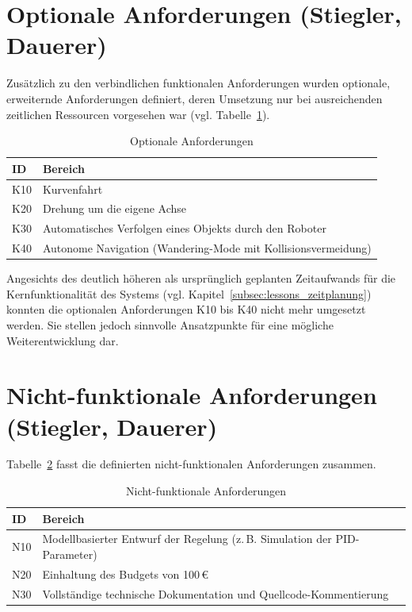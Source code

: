 \documentclass[fontsize=12pt,
parskip=half,	%
department=FakM,  %
logostyle=flat,
twoside, %
DIV=15,BCOR=10mm, %
]{OTHRreprt}
\begin{document}
\section{Optionale Anforderungen (Stiegler, Dauerer)}
\label{sec:optionale_anforderungen}

Zusätzlich zu den verbindlichen funktionalen Anforderungen wurden optionale, erweiternde Anforderungen definiert, deren Umsetzung nur bei ausreichenden zeitlichen Ressourcen vorgesehen war (vgl. Tabelle~\ref{tab:optionale_anforderungen}).

\begin{table}[h]
    \centering
    \caption{Optionale Anforderungen}
    \label{tab:optionale_anforderungen}
    \begin{tabular}{|l|l|}
        \hline
        \textbf{ID} & \textbf{Bereich} \\
        \hline
        K10 & Kurvenfahrt \\
        \hline
        K20 & Drehung um die eigene Achse \\
        \hline
        K30 & Automatisches Verfolgen eines Objekts durch den Roboter \\
        \hline
        K40 & Autonome Navigation (Wandering-Mode mit Kollisionsvermeidung) \\
        \hline
    \end{tabular}
\end{table}

Angesichts des deutlich höheren als ursprünglich geplanten Zeitaufwands für die Kernfunktionalität des Systems (vgl. Kapitel~\ref{subsec:lessons_zeitplanung}) konnten die optionalen Anforderungen K10 bis K40 nicht mehr umgesetzt werden. 
Sie stellen jedoch sinnvolle Ansatzpunkte für eine mögliche Weiterentwicklung dar.

\section{Nicht-funktionale Anforderungen (Stiegler, Dauerer)}
\label{sec:nichtfunktionale_anforderungen}

Tabelle~\ref{tab:nichtfunktionale_anforderungen} fasst die definierten nicht-funktionalen Anforderungen zusammen.

\begin{table}[h]
    \centering
    \caption{Nicht-funktionale Anforderungen}
    \label{tab:nichtfunktionale_anforderungen}
    \begin{tabular}{|l|p{9cm}|}
        \hline
        \textbf{ID} & \textbf{Bereich} \\
        \hline
        N10 & Modellbasierter Entwurf der Regelung (z.\,B. Simulation der PID-Parameter) \\
        \hline
        N20 & Einhaltung des Budgets von 100\,€ \\
        \hline
        N30 & Vollständige technische Dokumentation und Quellcode-Kommentierung \\
        \hline
    \end{tabular}
\end{table}
\end{document}
